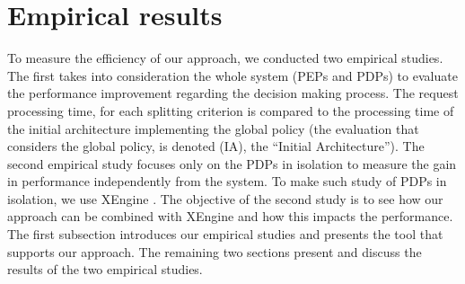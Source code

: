 \section{Empirical results} \label{sec:experiment}
To measure the efficiency of our approach, we conducted two empirical studies. The first takes into consideration the whole system 
(PEPs and PDPs) to evaluate the performance improvement regarding the decision making process. The request processing time, 
for each splitting criterion is compared to the processing time of the initial architecture implementing the global policy (the evaluation 
that considers the global policy, is denoted (IA), the ``Initial Architecture''). The second empirical study focuses only on the PDPs in isolation to measure the gain in performance
 independently from the system. To make such study of PDPs in isolation, we use XEngine \cite{Xengine}. The objective of the second study is to see how our approach can be 
combined with XEngine and how this impacts the performance. The first subsection introduces our empirical studies and presents the tool that supports our approach. The remaining two 
sections present and discuss the results of the two empirical studies.  

